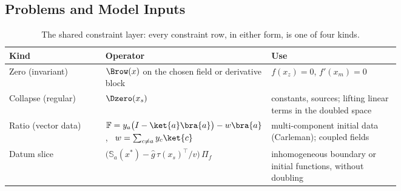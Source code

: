 \subsection{Problems and Model Inputs}
\label{sec:pipeline-inputs}

\begin{table}[htbp]
    \centering
    \caption{The shared constraint layer: every constraint row, in either form, is one of four kinds.}
    \label{tab:constraint-kinds}
    \small
    \begin{tabular}{@{}l p{0.42\linewidth} p{0.33\linewidth}@{}}
        \toprule
        Kind & Operator & Use \\
        \midrule
        Zero (invariant) & $\Brow(x)$ on the chosen field or derivative block & $f(x_z)=0$, $f'(x_m)=0$ \\
        Collapse (regular) & $\Dzero(x_s)$ & constants, sources; lifting linear terms in the doubled space \\
        Ratio (vector data) & $\mathbb{F} = y_a\bigl(I - \ket{a}\bra{a}\bigr) - w\bra{a}$, \ $w = \sum_{c\ne a} y_c\ket{c}$ & multi-component initial data (Carleman); coupled fields \\
        Datum slice & $\bigl(\mathbb{S}_a(x^\ast) - \hat g\,\tau(x_s)^{\top}/v\bigr)\,\Pi_f$ & inhomogeneous boundary or initial functions, without doubling \\
        \bottomrule
    \end{tabular}
\end{table}

